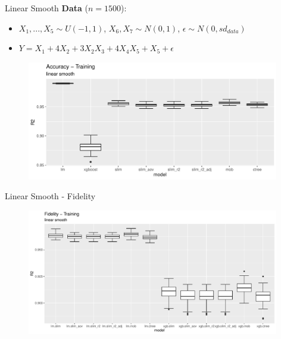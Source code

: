 \documentclass[9pt, xcolor=table]{beamer}
\begin{document}
\begin{frame}{Linear Smooth}
\textbf{Data} ($n= 1500$):
\begin{itemize}
    \item $X_1,..., X_5 \sim U(-1,1)$, $X_6, X_7 \sim N(0,1)$, $\epsilon \sim N(0, sd_{data})$
    \item $ Y = X_1 + 4   X_2 + 3   X_2   X_3 + 4  X_4  X_5 + X_5 + \epsilon $
\end{itemize}

\begin{figure}
    \includegraphics[width=11cm]{Figures/Performance/linear_smooth/r2_acc_train.pdf}
\end{figure}
\end{frame}

\begin{frame}{Linear Smooth - Fidelity}
\begin{figure}
    \includegraphics[width=11cm]{Figures/Performance/linear_smooth/r2_fidelity_train.pdf}
\end{figure}
    
\end{frame}
\end{document}
